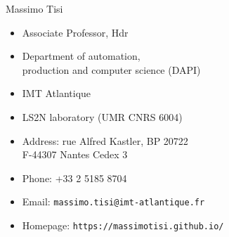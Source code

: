 \documentclass[10pt,a4paper]{article}
\def\name{Massimo Tisi}
\begin{document}
{\huge \name}


\vspace{0.25in}
\begin{minipage}[t]{0.5\textwidth}
  \begin{itemize}
  \item Associate Professor, Hdr
  \item Department of automation,\\
    production and computer science (DAPI)
  \item IMT Atlantique
  \item LS2N laboratory (UMR CNRS 6004)
  \end{itemize}

\end{minipage}
\begin{minipage}[t]{0.5\textwidth}
  \begin{itemize}
  \item Address: rue Alfred Kastler, BP 20722 \\
  F-44307 Nantes Cedex 3
  \item Phone: +33 2 5185 8704
  \item Email: \texttt{massimo.tisi@imt-atlantique.fr}
  \item Homepage: \texttt{https://massimotisi.github.io/}
  \end{itemize}
\end{minipage}





\end{document}
